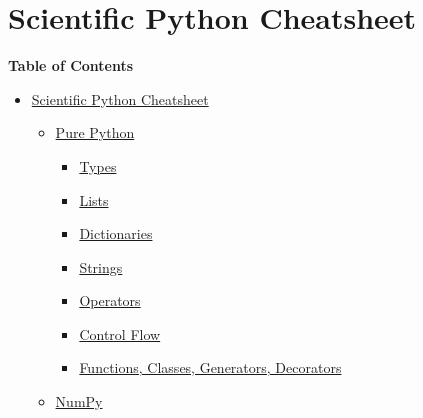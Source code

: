 \documentclass[10pt,a4paperpaper,twocolumn]{article}
\date{}
\providecommand{\tightlist}{%
  \setlength{\itemsep}{0pt}\setlength{\parskip}{0pt}}
\begin{document}
\hypertarget{scientific-python-cheatsheet}{\section{Scientific Python
Cheatsheet}\label{scientific-python-cheatsheet}}

\textbf{Table of Contents}

\begin{itemize}
\tightlist
\item
  \protect\hyperlink{scientific-python-cheatsheet}{Scientific Python
  Cheatsheet}

  \begin{itemize}
  \tightlist
  \item
    \protect\hyperlink{pure-python}{Pure Python}

    \begin{itemize}
    \tightlist
    \item
      \protect\hyperlink{types}{Types}
    \item
      \protect\hyperlink{lists}{Lists}
    \item
      \protect\hyperlink{dictionaries}{Dictionaries}
    \item
      \protect\hyperlink{strings}{Strings}
    \item
      \protect\hyperlink{operators}{Operators}
    \item
      \protect\hyperlink{control-flow}{Control Flow}
    \item
      \protect\hyperlink{functions-classes-generators-decorators}{Functions,
      Classes, Generators, Decorators}
    \end{itemize}
  \item
    \protect\hyperlink{numpy}{NumPy}


\end{itemize}
\end{itemize}
\end{document}
